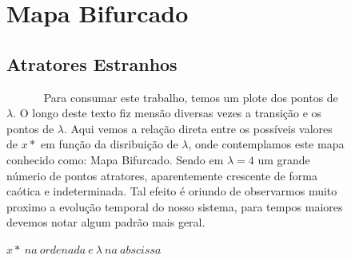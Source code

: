 \documentclass[pdftex,12pt,a4paper]{article}
\begin{document}
\begin{figure}

\section{Mapa Bifurcado}

\subsection{Atratores Estranhos}

~~~~~~ Para consumar este trabalho, temos um plote dos pontos de $\lambda$. O longo deste texto fiz mensão diversas vezes a transição e os pontos de $\lambda$. Aqui vemos a relação direta entre os possíveis valores de $x*$ em função da disribuição de $\lambda$, onde contemplamos este mapa conhecido como: Mapa Bifurcado.  Sendo em $\lambda = 4$ um grande númerio de pontos atratores, aparentemente crescente de forma caótica e indeterminada. Tal efeito é oriundo de observarmos muito proximo a evolução temporal do nosso sistema, para tempos maiores devemos notar algum padrão mais geral.

\centering
\caption{$0 \leq \lambda \leq 4.00$.}
\caption*{ $x*\ na\ ordenada\ e\ \lambda\ na\ abscissa$ }
\end{figure}
\end{document}
